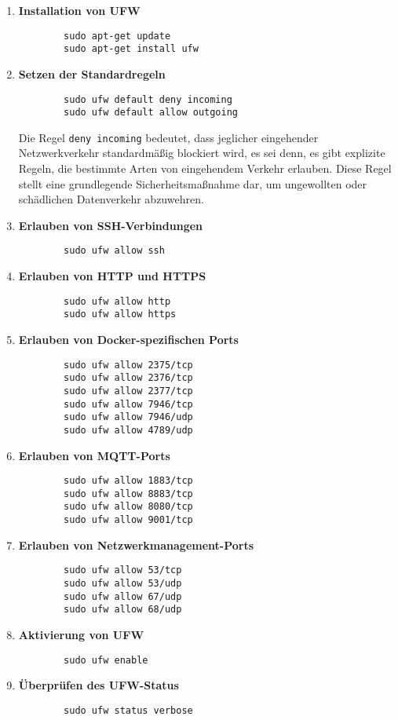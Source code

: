\begin{enumerate}
	\item \textbf{Installation von UFW}
	\begin{verbatim}
		sudo apt-get update
		sudo apt-get install ufw
	\end{verbatim}
	
	\item \textbf{Setzen der Standardregeln}
	\begin{verbatim}
		sudo ufw default deny incoming
		sudo ufw default allow outgoing
	\end{verbatim}
	Die Regel \texttt{deny incoming} bedeutet, dass jeglicher eingehender Netzwerkverkehr standardmäßig blockiert wird, es sei denn, es gibt explizite Regeln, die bestimmte Arten von eingehendem Verkehr erlauben. Diese Regel stellt eine grundlegende Sicherheitsmaßnahme dar, um ungewollten oder schädlichen Datenverkehr abzuwehren.\\
	
	\item \textbf{Erlauben von SSH-Verbindungen}
	\begin{verbatim}
		sudo ufw allow ssh
	\end{verbatim}
	
	\item \textbf{Erlauben von HTTP und HTTPS}
	\begin{verbatim}
		sudo ufw allow http
		sudo ufw allow https
	\end{verbatim}
	
	\item \textbf{Erlauben von Docker-spezifischen Ports}
	\begin{verbatim}
		sudo ufw allow 2375/tcp
		sudo ufw allow 2376/tcp
		sudo ufw allow 2377/tcp
		sudo ufw allow 7946/tcp
		sudo ufw allow 7946/udp
		sudo ufw allow 4789/udp
	\end{verbatim}
	
	\item \textbf{Erlauben von MQTT-Ports}
	\begin{verbatim}
		sudo ufw allow 1883/tcp
		sudo ufw allow 8883/tcp
		sudo ufw allow 8080/tcp
		sudo ufw allow 9001/tcp
	\end{verbatim}
	
	\item \textbf{Erlauben von Netzwerkmanagement-Ports}
	\begin{verbatim}
		sudo ufw allow 53/tcp
		sudo ufw allow 53/udp
		sudo ufw allow 67/udp
		sudo ufw allow 68/udp
	\end{verbatim}
	
	\item \textbf{Aktivierung von UFW}
	\begin{verbatim}
		sudo ufw enable
	\end{verbatim}
	
	\item \textbf{Überprüfen des UFW-Status}
	\begin{verbatim}
		sudo ufw status verbose
	\end{verbatim}
\end{enumerate}

